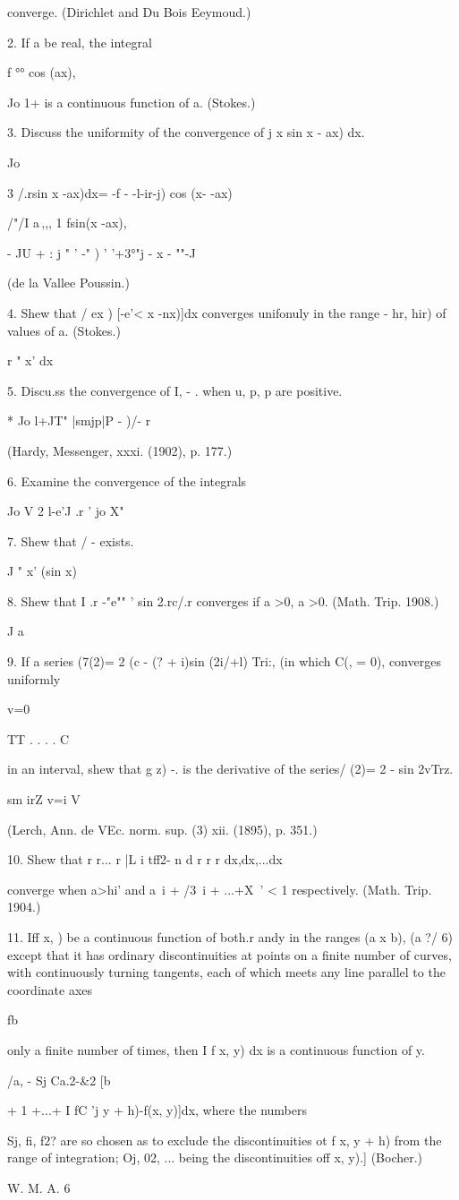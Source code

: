 converge. (Dirichlet and Du Bois Eeymoud.)

2. If a be real, the integral

f °° cos (ax),

Jo 1+ is a continuous function of a. (Stokes.)

3. Discuss the uniformity of the convergence of j x sin x - ax) dx.

Jo

3 /.rsin x -ax)dx= -f - -l-ir-j) cos (x- -ax)

/"/I a\,,,, 1 fsin(x -ax), ~\

- JU + : j " ' -" ) ' '+3°"j - x - ""-J

(de la Vallee Poussin.)

4. Shew that / ex ) [-e'< x -nx)]dx converges unifonuly in the range -
hr, hir) of values of a. (Stokes.)

r " x' dx

5. Discu.ss the convergence of I, - . when u, p, p are positive.

* Jo l+JT" |smjp|P - )/- r

(Hardy, Messenger, xxxi. (1902), p. 177.)

6. Examine the convergence of the integrals

Jo V 2 l-e'J .r ' jo X"


7. Shew that / - exists.

J " x' (sin x)

8. Shew that I .r -"e"" ' sin 2.rc/.r converges if a >0, a >0. (Math.
Trip. 1908.)

J a

9. If a series (7(2)= 2 (c - (? + i)sin (2i/+l) Tri:, (in which C(, =
0), converges uniformly

v=0

TT . . . . C

in an interval, shew that g z) -. is the derivative of the series/
(2)= 2 - sin 2vTrz.

sm irZ v=i V

(Lerch, Ann. de VEc. norm. sup. (3) xii. (1895), p. 351.)

10. Shew that r r... r |L i tff2- n d r r r dx,dx,...dx

converge when a>hi' and a~i + /3~i + ...+X~' < 1 respectively. (Math.
Trip. 1904.)

11. Iff x, ) be a continuous function of both.r andy in the ranges (a
x b), (a ?/ 6) except that it has ordinary discontinuities at points
on a finite number of curves, with continuously turning tangents, each
of which meets any line parallel to the coordinate axes

fb

only a finite number of times, then I f x, y) dx is a continuous
function of y.

/a, - Sj Ca.2-\&2 [b

+ 1 +...+ I fC 'j y + h)-f(x, y)]dx, where the numbers

Sj,   fi, f2?  are so chosen as to exclude the
discontinuities ot f x, y + h) from the range of integration; Oj, 02,
... being the discontinuities off x, y).] (Bocher.)

W. M. A. 6

